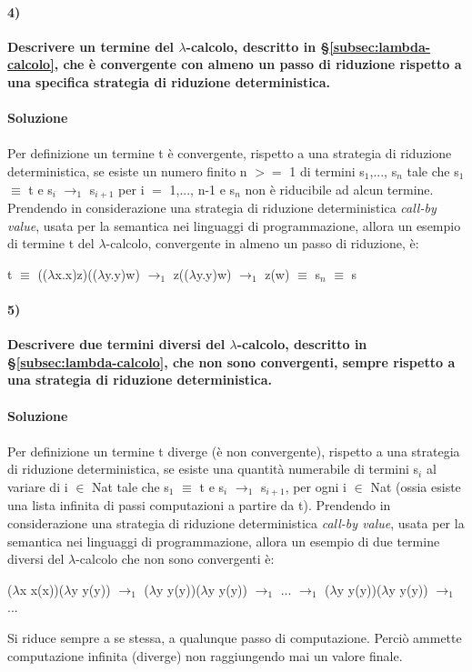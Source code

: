 \paragraph{4)}
\textbf{Descrivere un termine del $\lambda$-calcolo, descritto in \S\ref{subsec:lambda-calcolo},  che \`e convergente con almeno un passo di riduzione rispetto a una specifica strategia di riduzione deterministica.}\\\\
\textbf{Soluzione}\\\\
Per definizione un termine t \`e convergente, rispetto a una strategia di
riduzione deterministica, se esiste un numero finito n $>=$ 1 di termini s$_1$,..., s$_n$ tale che s$_1$ $\equiv$ t e s$_i$ $\rightarrow_1$ s$_{i + 1}$ per i $=$ 1,..., n-1 e s$_n$ non \`e riducibile ad alcun termine.\\
Prendendo in considerazione una strategia di riduzione deterministica \textit{call-by value}, usata per la semantica nei linguaggi di programmazione, allora un esempio di termine t del $\lambda$-calcolo, convergente in almeno un passo di riduzione, \`e:
\begin{center}t $\equiv$ (($\lambda$x.x)z)(($\lambda$y.y)w) $\rightarrow_1$ z(($\lambda$y.y)w) $\rightarrow_1$ z(w) $\equiv$ s$_n$ $\equiv$ s\end{center}
\paragraph{5)} 
\textbf{Descrivere due termini diversi del $\lambda$-calcolo, descritto in \S\ref{subsec:lambda-calcolo}, che non sono convergenti, sempre rispetto a una strategia di riduzione deterministica.}\\\\
\textbf{Soluzione}\\\\
Per definizione un termine t diverge (\`e non convergente), rispetto a una strategia
di riduzione deterministica, se esiste una quantit\`a numerabile di termini s$_i$ al variare di i $\in$ Nat tale che s$_1$ $\equiv$ t e s$_i$ $\rightarrow_1$ s$_{i+1}$, per ogni i $\in$ Nat (ossia esiste una lista infinita di passi computazioni a partire da t).
Prendendo in considerazione una strategia di riduzione deterministica \textit{call-by value}, usata per la semantica nei linguaggi di programmazione, allora un esempio di due termine diversi del $\lambda$-calcolo che non sono convergenti \`e:
\begin{center}($\lambda$x x(x))($\lambda$y y(y)) $\rightarrow_1$ ($\lambda$y y(y))($\lambda$y y(y))  $\rightarrow_1$ ... $\rightarrow_1$ ($\lambda$y y(y))($\lambda$y y(y)) $\rightarrow_1$ ... \end{center}
Si riduce sempre a se stessa, a qualunque passo di computazione. Perci\`o ammette computazione infinita (diverge) non raggiungendo mai un valore finale.
